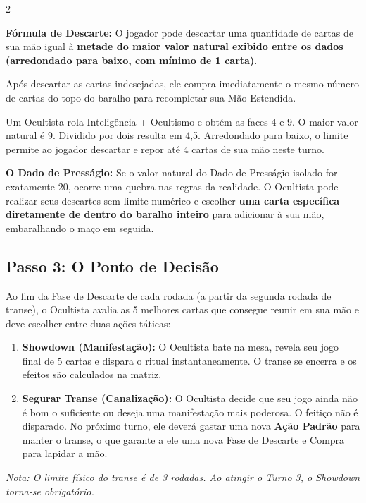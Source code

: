 \documentclass[a4paper,11pt,openany]{book}
\begin{document}
\begin{multicols}{2}
\begin{regra}
\textbf{Fórmula de Descarte:} O jogador pode descartar uma quantidade de cartas de sua mão igual à \textbf{metade do maior valor natural exibido entre os dados (arredondado para baixo, com mínimo de 1 carta)}.
\end{regra}

Após descartar as cartas indesejadas, ele compra imediatamente o mesmo número de cartas do topo do baralho para recompletar sua Mão Estendida.

\begin{exemplo}
Um Ocultista rola Inteligência + Ocultismo e obtém as faces 4 e 9. O maior valor natural é 9. Dividido por dois resulta em 4,5. Arredondado para baixo, o limite permite ao jogador descartar e repor até 4 cartas de sua mão neste turno.
\end{exemplo}

\begin{regra}
\textbf{O Dado de Presságio:} Se o valor natural do Dado de Presságio isolado for exatamente 20, ocorre uma quebra nas regras da realidade. O Ocultista pode realizar seus descartes sem limite numérico e escolher \textbf{uma carta específica diretamente de dentro do baralho inteiro} para adicionar à sua mão, embaralhando o maço em seguida.
\end{regra}

\subsection{Passo 3: O Ponto de Decisão}
Ao fim da Fase de Descarte de cada rodada (a partir da segunda rodada de transe), o Ocultista avalia as 5 melhores cartas que consegue reunir em sua mão e deve escolher entre duas ações táticas:

\begin{enumerate}
    \item \textbf{Showdown (Manifestação):} O Ocultista bate na mesa, revela seu jogo final de 5 cartas e dispara o ritual instantaneamente. O transe se encerra e os efeitos são calculados na matriz.
    \item \textbf{Segurar Transe (Canalização):} O Ocultista decide que seu jogo ainda não é bom o suficiente ou deseja uma manifestação mais poderosa. O feitiço não é disparado. No próximo turno, ele deverá gastar uma nova \textbf{Ação Padrão} para manter o transe, o que garante a ele uma nova Fase de Descarte e Compra para lapidar a mão.
\end{enumerate}

\textit{Nota: O limite físico do transe é de 3 rodadas. Ao atingir o Turno 3, o Showdown torna-se obrigatório.}

\end{multicols}
\end{document}

